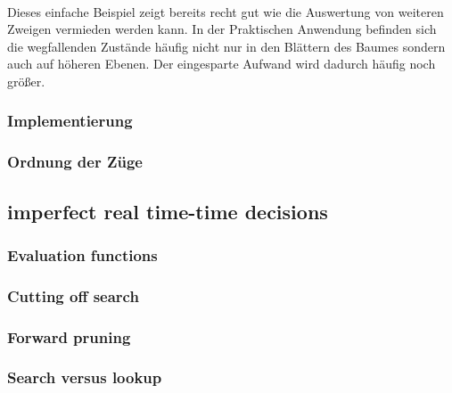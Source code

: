 \paragraph{}  
Dieses einfache Beispiel zeigt bereits recht gut wie die Auswertung von weiteren Zweigen vermieden werden kann. In der Praktischen Anwendung befinden sich die wegfallenden Zustände häufig nicht nur in den Blättern des Baumes sondern auch auf höheren Ebenen. Der eingesparte Aufwand wird dadurch häufig noch größer.  

\subsubsection{Implementierung}
\subsubsection{Ordnung der Züge}


\subsection{imperfect real time-time decisions}
\subsubsection{Evaluation functions}
\subsubsection{Cutting off search}
\subsubsection{Forward pruning}
\subsubsection{Search versus lookup}
